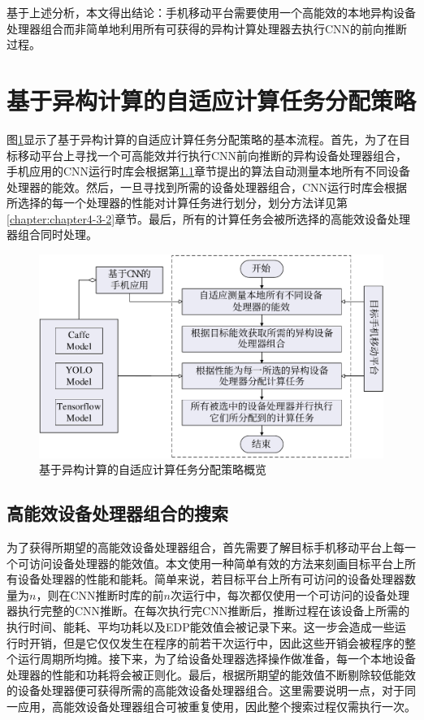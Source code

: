 基于上述分析，本文得出结论：手机移动平台需要使用一个高能效的本地异构设备处理器组合而非简单地利用所有可获得的异构计算处理器去执行CNN的前向推断过程。

\section{基于异构计算的自适应计算任务分配策略}

图\ref{figure:figure29}显示了基于异构计算的自适应计算任务分配策略的基本流程。首先，为了在目标移动平台上寻找一个可高能效并行执行CNN前向推断的异构设备处理器组合，手机应用的CNN运行时库会根据第\ref{chapter:chapter4-3-1}章节提出的算法自动测量本地所有不同设备处理器的能效。然后，一旦寻找到所需的设备处理器组合，CNN运行时库会根据所选择的每一个处理器的性能对计算任务进行划分，划分方法详见第\ref{chapter:chapter4-3-2}章节。最后，所有的计算任务会被所选择的高能效设备处理器组合同时处理。

\begin{figure}[htbp]
    \centering
    \includegraphics[height=0.4\textwidth]{figures/strategy_overview.pdf}
    \caption{基于异构计算的自适应计算任务分配策略概览}\label{figure:figure29}
\end{figure}

\subsection{高能效设备处理器组合的搜索}
\label{chapter:chapter4-3-1}

为了获得所期望的高能效设备处理器组合，首先需要了解目标手机移动平台上每一个可访问设备处理器的能效值。本文使用一种简单有效的方法来刻画目标平台上所有设备处理器的性能和能耗。简单来说，若目标平台上所有可访问的设备处理器数量为$n$，则在CNN推断时库的前$n$次运行中，每次都仅使用一个可访问的设备处理器执行完整的CNN推断。在每次执行完CNN推断后，推断过程在该设备上所需的执行时间、能耗、平均功耗以及EDP能效值会被记录下来。这一步会造成一些运行时开销，但是它仅仅发生在程序的前若干次运行中，因此这些开销会被程序的整个运行周期所均摊。接下来，为了给设备处理器选择操作做准备，每一个本地设备处理器的性能和功耗将会被正则化。最后，根据所期望的能效值不断剔除较低能效的设备处理器便可获得所需的高能效设备处理器组合。这里需要说明一点，对于同一应用，高能效设备处理器组合可被重复使用，因此整个搜索过程仅需执行一次。

